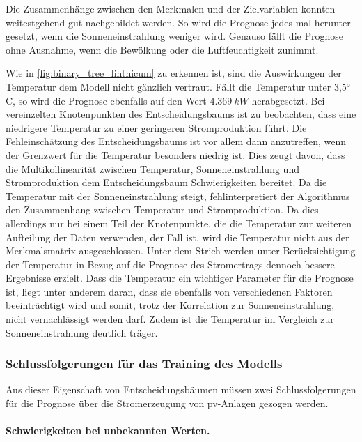 \documentclass[12pt, a4paper]{article}
\begin{document}
Die Zusammenhänge zwischen den Merkmalen und der Zielvariablen konnten weitestgehend gut nachgebildet werden. So wird die Prognose jedes mal herunter gesetzt, wenn die Sonneneinstrahlung weniger wird. Genauso fällt die Prognose ohne Ausnahme, wenn die Bewölkung oder die Luftfeuchtigkeit zunimmt. 

Wie in \autoref{fig:binary_tree_linthicum} zu erkennen ist, sind die Auswirkungen der Temperatur dem Modell nicht gänzlich vertraut. Fällt die Temperatur unter 3,5° C, so wird die Prognose ebenfalls auf den Wert $4.369\ kW$ herabgesetzt. Bei vereinzelten Knotenpunkten des Entscheidungsbaums ist zu beobachten, dass eine niedrigere Temperatur zu einer geringeren Stromproduktion führt. Die Fehleinschätzung des Entscheidungsbaums ist vor allem dann anzutreffen, wenn der Grenzwert für die Temperatur besonders niedrig ist. Dies zeugt davon, dass die Multikollinearität zwischen Temperatur, Sonneneinstrahlung und Stromproduktion dem Entscheidungsbaum Schwierigkeiten bereitet. Da die Temperatur mit der Sonneneinstrahlung steigt, fehlinterpretiert der Algorithmus den Zusammenhang zwischen Temperatur und Stromproduktion. Da dies allerdings nur bei einem Teil der Knotenpunkte, die die Temperatur zur weiteren Aufteilung der Daten verwenden, der Fall ist, wird die Temperatur nicht aus der Merkmalsmatrix ausgeschlossen. Unter dem Strich werden unter Berücksichtigung der Temperatur in Bezug auf die Prognose des Stromertrags dennoch bessere Ergebnisse erzielt. Dass die Temperatur ein wichtiger Parameter für die Prognose ist, liegt unter anderem daran, dass sie ebenfalls von verschiedenen Faktoren beeinträchtigt wird und somit, trotz der Korrelation zur Sonneneinstrahlung, nicht vernachlässigt werden darf. Zudem ist die Temperatur im Vergleich zur Sonneneinstrahlung deutlich träger.

\subsubsection{Schlussfolgerungen für das Training des Modells}
\label{subsubsec:conclusion_for_training}

Aus dieser Eigenschaft von Entscheidungsbäumen müssen zwei Schlussfolgerungen für die Prognose über die Stromerzeugung von \ac{pv}-Anlagen gezogen werden. 

\paragraph{Schwierigkeiten bei unbekannten Werten.} 
\end{document}
